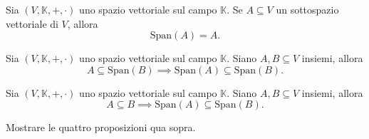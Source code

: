 \begin{prop}
    Sia $(V, \mathbb{K}, +, \cdot)$ uno spazio vettoriale sul campo $\mathbb{K}$. Se $A \subseteq V$ un sottospazio vettoriale di $V$, allora
    $$
        \text{Span}(A) = A.
    $$
\end{prop}
\begin{prop}
    Sia $(V, \mathbb{K}, +, \cdot)$ uno spazio vettoriale sul campo $\mathbb{K}$. Siano $A, B \subseteq V$ insiemi, allora
    $$
        A \subseteq \text{Span}(B) \implies \text{Span}(A) \subseteq \text{Span}(B).
    $$
    \label{prop:incl_sub}
\end{prop}
\begin{prop}
    Sia $(V, \mathbb{K}, +, \cdot)$ uno spazio vettoriale sul campo $\mathbb{K}$. Siano $A, B \subseteq V$ insiemi, allora
    $$
        A \subseteq B \implies \text{Span}(A) \subseteq \text{Span}(B).
    $$
    \label{prop:incl_span}
\end{prop}
\begin{exercise}
    \label{ex:1.3} Mostrare le quattro proposizioni qua sopra.
\end{exercise}
